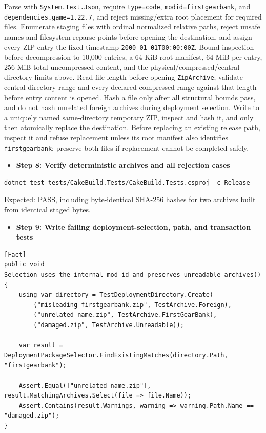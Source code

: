 \documentclass[
  10pt,
  letterpaper,
]{article}
\newcommand{\passthrough}[1]{#1}
\providecommand{\tightlist}{%
  \setlength{\itemsep}{0pt}\setlength{\parskip}{0pt}}
\begin{document}
Parse with \passthrough{\lstinline!System.Text.Json!}, require
\passthrough{\lstinline!type=code!},
\passthrough{\lstinline!modid=firstgearbank!}, and
\texttt{dependencies.}\allowbreak{}\texttt{game=}\allowbreak{}\texttt{1.}\allowbreak{}\texttt{22.}\allowbreak{}\texttt{7},
and reject missing/extra root placement for required files. Enumerate
staging files with ordinal normalized relative paths, reject unsafe
names and filesystem reparse points before opening the destination, and
assign every ZIP entry the fixed timestamp
\passthrough{\lstinline!2000-01-01T00:00:00Z!}. Bound inspection before
decompression to 10,000 entries, a 64 KiB root manifest, 64 MiB per
entry, 256 MiB total uncompressed content, and the
physical/\allowbreak{}compressed/\allowbreak{}central-directory limits
above. Read file length before opening
\passthrough{\lstinline!ZipArchive!}; validate central-directory range
and every declared compressed range against that length before entry
content is opened. Hash a file only after all structural bounds pass,
and do not hash unrelated foreign archives during deployment selection.
Write to a uniquely named same-directory temporary ZIP, inspect and hash
it, and only then atomically replace the destination. Before replacing
an existing release path, inspect it and refuse replacement unless its
root manifest also identifies \passthrough{\lstinline!firstgearbank!};
preserve both files if replacement cannot be completed safely.

\begin{itemize}
\tightlist
\item[$\square$]
  \textbf{Step 8: Verify deterministic archives and all rejection cases}
\end{itemize}

\begin{lstlisting}
dotnet test tests/CakeBuild.Tests/CakeBuild.Tests.csproj -c Release
\end{lstlisting}

Expected: PASS, including byte-identical SHA-256 hashes for two archives
built from identical staged bytes.

\begin{itemize}
\tightlist
\item[$\square$]
  \textbf{Step 9: Write failing deployment-selection, path, and
  transaction tests}
\end{itemize}

\begin{lstlisting}
[Fact]
public void Selection_uses_the_internal_mod_id_and_preserves_unreadable_archives()
{
    using var directory = TestDeploymentDirectory.Create(
        ("misleading-firstgearbank.zip", TestArchive.Foreign),
        ("unrelated-name.zip", TestArchive.FirstGearBank),
        ("damaged.zip", TestArchive.Unreadable));

    var result = DeploymentPackageSelector.FindExistingMatches(directory.Path, "firstgearbank");

    Assert.Equal(["unrelated-name.zip"], result.MatchingArchives.Select(file => file.Name));
    Assert.Contains(result.Warnings, warning => warning.Path.Name == "damaged.zip");
}
\end{lstlisting}
\end{document}
